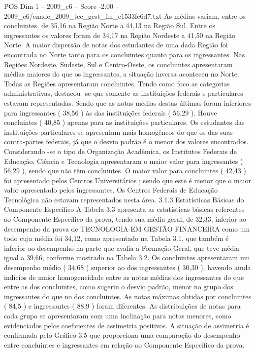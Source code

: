 \begin{textsample}{POS Dim 1 – 2009\_c6 – Score -2.00 – 2009\_c6/enade\_2009\_tec\_gest\_fin\_c1533fe6d7.txt}
As médias variam, entre os concluintes, de 35,16 na Região Norte a 44,13 na Região Sul.
Entre os ingressantes os valores foram de 34,17 na Região Nordeste a 41,50 na Região Norte.
A maior dispersão de notas dos estudantes de uma dada Região foi encontrada no Norte tanto para os concluintes quanto para os ingressantes.
Nas Regiões Nordeste, Sudeste, Sul e Centro-Oeste, os concluintes apresentaram médias maiores do que os ingressantes, a situação inversa aconteceu no Norte.
Todas as Regiões apresentaram concluintes.
Tendo como foco as categorias administrativas, destacou -se que somente as instituições federais e particulares estavam representadas.
Sendo que as notas médias destas últimas foram inferiores para ingressantes ( 38,56 ) às das instituições federais ( 56,29 ).
Houve concluintes ( 40,85 ) apenas para as instituições particulares.
Os estudantes das instituições particulares se apresentam mais homogêneos do que os das suas contra-partes federais, já que o desvio padrão é o menor dos valores encontrados.
Considerando -se o tipo de Organização Acadêmica, os Institutos Federais de Educação, Ciência e Tecnologia apresentaram o maior valor para ingressantes ( 56,29 ), sendo que não têm concluintes.
O maior valor para concluintes ( 42,43 ) foi apresentado pelos Centros Universitários ; sendo que este é menor que o maior valor apresentado pelos ingressantes.
Os Centros Federais de Educação Tecnológica não estavam representados nesta área. 3.1.3 Estatísticas Básicas do Componente Específico A Tabela 3.3 apresenta as estatísticas básicas referentes ao Componente Específico da prova, tendo sua média geral, de 32,33, inferior ao desempenho da prova de TECNOLOGIA EM GESTÃO FINANCEIRA como um todo cuja média foi 34,12, como apresentado na Tabela 3.1, que também é inferior ao desempenho na parte que avalia a Formação Geral, que teve média igual a 39,66, conforme mostrado na Tabela 3.2.
Os concluintes apresentaram um desempenho médio ( 34,68 ) superior ao dos ingressantes ( 30,30 ), havendo ainda indícios de maior homogeneidade entre as notas médias dos ingressantes do que entre as dos concluintes, como sugeriu o desvio padrão, menor no grupo dos ingressantes do que no dos concluintes.
As notas máximas obtidas por concluintes ( 84,5 ) e ingressantes ( 88,9 ) foram diferentes.
As distribuições de notas para cada grupo se apresentaram com uma inclinação para notas menores, como evidenciados pelos coeficientes de assimetria positivos.
A situação de assimetria é confirmada pelo Gráfico 3.5 que proporciona uma comparação do desempenho entre concluintes e ingressantes em relação ao Componente Específico da prova.

\end{textsample}
